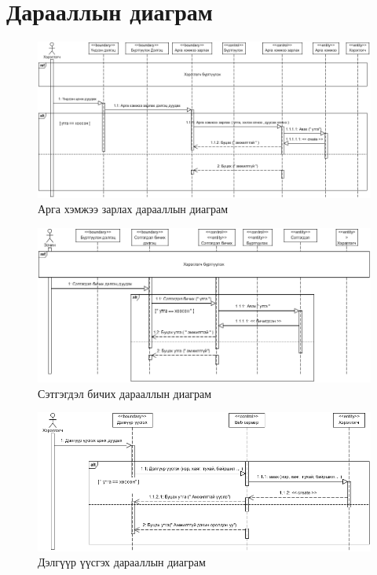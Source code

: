 \section{Дарааллын диаграм }
	\begin{figure}[!h]
		\includegraphics[scale=0.48]{Diagrams/event_s}
		\caption[Арга хэмжээ зарлах дарааллын диаграм]{Арга хэмжээ зарлах дарааллын диаграм}
		\label{text}
	\end{figure}

	\begin{figure}[!h]
		\includegraphics[scale=0.53]{Diagrams/comment_s}
		\caption[Сэтгэгдэл бичих дарааллын диаграм]{Сэтгэгдэл бичих дарааллын диаграм}
		\label{text}
	\end{figure}
	
	\begin{figure}[!h]
		\includegraphics[scale=0.55]{Diagrams/create_s}
		\caption[Дэлгүүр үүсгэх дарааллын диаграм]{Дэлгүүр үүсгэх дарааллын диаграм}
		\label{text}
	\end{figure}


